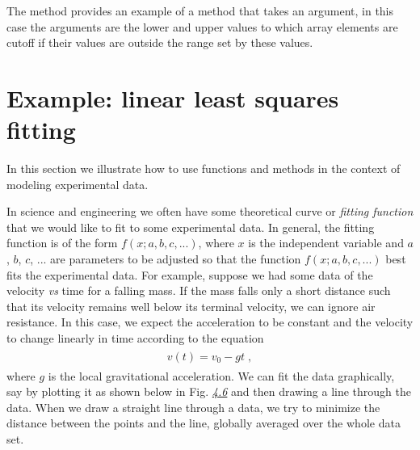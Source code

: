 \documentclass[letterpaper,10pt,english]{sphinxmanual}
\begin{document}
The  method provides an example of a method that takes an argument, in this case the arguments are the lower and upper values to which array elements are cutoff if their values are outside the range set by these values.


\section{Example: linear least squares fitting}
\label{chap7/chap7_funcs:example-linear-least-squares-fitting}\label{chap7/chap7_funcs:linfitfunc}\label{chap7/chap7_funcs:index-5}
In this section we illustrate how to use functions and methods in the context of modeling experimental data.

In science and engineering we often have some theoretical curve or \emph{fitting function} that we would like to fit to some experimental data.  In general, the fitting function is of the form $f(x; a, b, c, ...)$, where $x$ is the independent variable and $a$, $b$, $c$, ... are parameters to be adjusted so that the function $f(x; a, b, c, ...)$ best fits the experimental data.  For example, suppose we had some data of the velocity \emph{vs} time for a falling mass.  If the mass falls only a short distance such that its velocity remains well below its terminal velocity, we can ignore air resistance.  In this case, we expect the acceleration to be constant and the velocity to change linearly in time according to the equation
\label{chap7/chap7_funcs:equation-eq:veltime}\begin{gather}
\begin{split}v(t) = v_{0} - g t \;,\end{split}\label{chap7/chap7_funcs-eq:veltime}
\end{gather}
where $g$ is the local gravitational acceleration.  We can fit the data graphically, say by plotting it as shown below in Fig. {\hyperref[chap7/chap7_funcs:fig-fallingmassdataplot]{\emph{4.6}}} and then drawing a line through the data.  When we draw a straight line through a data, we try to minimize the distance between the points and the line, globally averaged over the whole data set.
\end{document}
